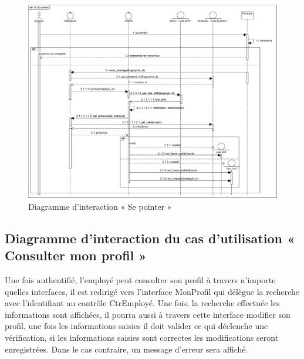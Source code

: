\begin{figure}[h!]
    \centering
    \includegraphics[scale=0.56]{images/DS/DI Se pointer.png}
    \caption{Diagramme d'interaction « Se pointer »}
    \label{fig34}
\end{figure}
        
\clearpage
    
\subsection*{Diagramme d'interaction du cas d'utilisation « Consulter mon profil »}
Une fois authentifié, l’employé peut consulter son profil à travers n’importe 
quelles interfaces, il est redirigé vers l’interface MonProfil qui délègue la 
recherche avec l’identifiant au contrôle CtrEmployé. Une fois, la recherche 
effectuée les informations sont affichées, il pourra aussi à travers cette 
interface modifier son profil, une fois les informations saisies il doit 
valider ce qui déclenche une vérification, si les informations saisies sont 
correctes les modifications seront enregistrées. Dans le cas contraire, un 
message d’erreur sera affiché.

